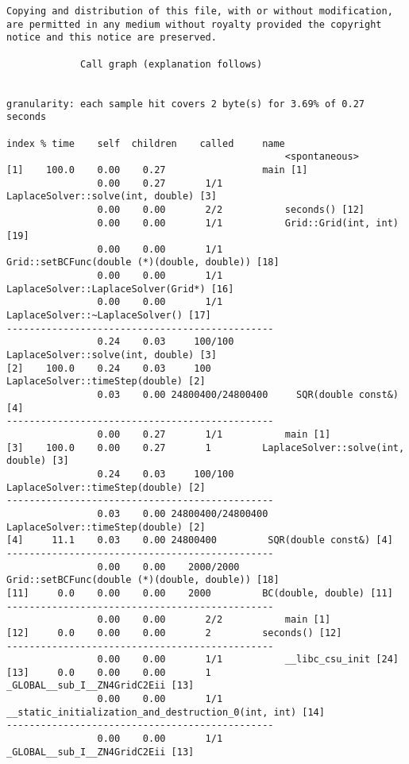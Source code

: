 \documentclass[a4paper,twosidep]{article}
\begin{document}
\begin{verbatim}
Copying and distribution of this file, with or without modification,
are permitted in any medium without royalty provided the copyright
notice and this notice are preserved.

		     Call graph (explanation follows)


granularity: each sample hit covers 2 byte(s) for 3.69% of 0.27 seconds

index % time    self  children    called     name
                                                 <spontaneous>
[1]    100.0    0.00    0.27                 main [1]
                0.00    0.27       1/1           LaplaceSolver::solve(int, double) [3]
                0.00    0.00       2/2           seconds() [12]
                0.00    0.00       1/1           Grid::Grid(int, int) [19]
                0.00    0.00       1/1           Grid::setBCFunc(double (*)(double, double)) [18]
                0.00    0.00       1/1           LaplaceSolver::LaplaceSolver(Grid*) [16]
                0.00    0.00       1/1           LaplaceSolver::~LaplaceSolver() [17]
-----------------------------------------------
                0.24    0.03     100/100         LaplaceSolver::solve(int, double) [3]
[2]    100.0    0.24    0.03     100         LaplaceSolver::timeStep(double) [2]
                0.03    0.00 24800400/24800400     SQR(double const&) [4]
-----------------------------------------------
                0.00    0.27       1/1           main [1]
[3]    100.0    0.00    0.27       1         LaplaceSolver::solve(int, double) [3]
                0.24    0.03     100/100         LaplaceSolver::timeStep(double) [2]
-----------------------------------------------
                0.03    0.00 24800400/24800400     LaplaceSolver::timeStep(double) [2]
[4]     11.1    0.03    0.00 24800400         SQR(double const&) [4]
-----------------------------------------------
                0.00    0.00    2000/2000        Grid::setBCFunc(double (*)(double, double)) [18]
[11]     0.0    0.00    0.00    2000         BC(double, double) [11]
-----------------------------------------------
                0.00    0.00       2/2           main [1]
[12]     0.0    0.00    0.00       2         seconds() [12]
-----------------------------------------------
                0.00    0.00       1/1           __libc_csu_init [24]
[13]     0.0    0.00    0.00       1         _GLOBAL__sub_I__ZN4GridC2Eii [13]
                0.00    0.00       1/1           __static_initialization_and_destruction_0(int, int) [14]
-----------------------------------------------
                0.00    0.00       1/1           _GLOBAL__sub_I__ZN4GridC2Eii [13]

\end{verbatim}
\end{document}
